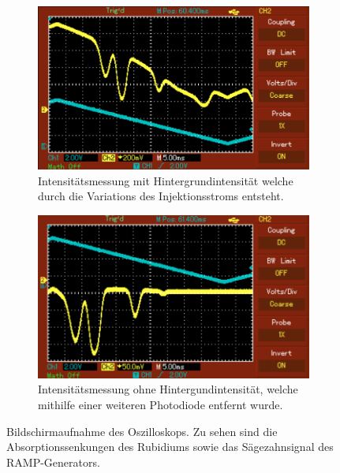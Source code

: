 \begin{figure}[H]
    \begin{subfigure}{0.49\textwidth}
    \centering
    \includegraphics[width=\linewidth]{data/rub2}
    \caption{Intensitätsmessung mit Hintergrundintensität welche durch die Variations des Injektionsstroms entsteht.}
    \label{abb:afig7}
    \end{subfigure}
    \begin{subfigure}{0.49\textwidth}
    \centering
    \includegraphics[width=\linewidth]{data/rub3}
    \caption{Intensitätsmessung ohne Hintergundintensität, welche mithilfe einer weiteren Photodiode entfernt wurde.}
    \label{abb:afig8}
    \end{subfigure}
    \caption{Bildschirmaufnahme des Oszilloskops. Zu sehen sind die Absorptionssenkungen des Rubidiums sowie das Sägezahnsignal des RAMP-Generators.}
\end{figure}
